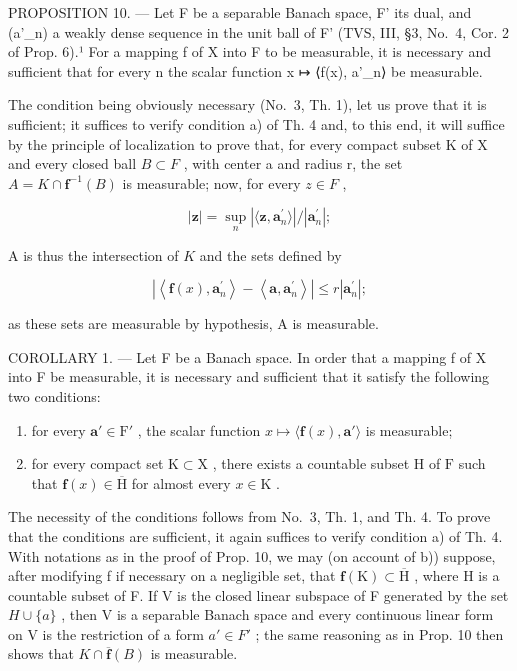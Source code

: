 PROPOSITION 10. --- Let F be a separable Banach space, F' its dual, and (a'\_n) a weakly dense sequence in the unit ball of F' (TVS, III, §3, No.~4, Cor. 2 of Prop. 6).¹ For a mapping f of X into F to be measurable, it is necessary and sufficient that for every n the scalar function x ↦ ⟨f(x), a'\_n⟩ be measurable.

The condition being obviously necessary (No.~3, Th. 1), let us prove that it is sufficient; it suffices to verify condition a) of Th. 4 and, to this end, it will suffice by the principle of localization to prove that, for every compact subset K of X and every closed ball \(B \subset F\) , with center a and radius r, the set \(A = K \cap \mathbf{f}^{-1}(B)\) is measurable; now, for every \(z \in F\) ,

\[
| \mathbf {z} | = \sup _ {n} | \langle \mathbf {z}, \mathbf {a} _ {n} ^ {\prime} \rangle | / | \mathbf {a} _ {n} ^ {\prime} |;
\]

A is thus the intersection of \(K\) and the sets defined by

\[
\left| \left\langle \mathbf {f} (x), \mathbf {a} _ {n} ^ {\prime} \right\rangle - \left\langle \mathbf {a}, \mathbf {a} _ {n} ^ {\prime} \right\rangle \right| \leqslant r \left| \mathbf {a} _ {n} ^ {\prime} \right|;
\]

as these sets are measurable by hypothesis, A is measurable.

COROLLARY 1. --- Let F be a Banach space. In order that a mapping f of X into F be measurable, it is necessary and sufficient that it satisfy the following two conditions:

\begin{enumerate}
\def\labelenumi{\alph{enumi})}
\tightlist
\item
  for every \(\mathbf{a}' \in \mathrm{F}'\) , the scalar function \(x \mapsto \langle \mathbf{f}(x), \mathbf{a}' \rangle\) is measurable;
\item
  for every compact set \(\mathrm{K} \subset \mathrm{X}\) , there exists a countable subset \(\mathrm{H}\) of \(\mathrm{F}\) such that \(\mathbf{f}(x) \in \overline{\mathrm{H}}\) for almost every \(x \in \mathrm{K}\) .
\end{enumerate}

The necessity of the conditions follows from No.~3, Th. 1, and Th. 4. To prove that the conditions are sufficient, it again suffices to verify condition a) of Th. 4. With notations as in the proof of Prop. 10, we may (on account of b)) suppose, after modifying f if necessary on a negligible set, that \(\mathbf{f}(\mathrm{K}) \subset \overline{\mathrm{H}}\) , where H is a countable subset of F. If V is the closed linear subspace of F generated by the set \(H \cup \{a\}\) , then V is a separable Banach space and every continuous linear form on V is the restriction of a form \(a' \in F'\) ; the same reasoning as in Prop. 10 then shows that \(K \cap \overline{\mathbf{f}}(B)\) is measurable.

